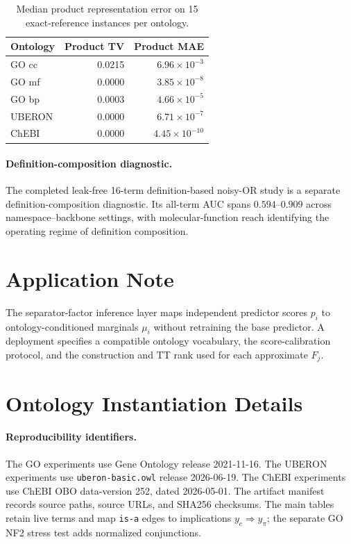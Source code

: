 \documentclass[letterpaper]{article}
\begin{document}
\begin{table}[t]
\centering
\small
\setlength{\tabcolsep}{6pt}
\begin{tabular}{lrr}
\toprule
Ontology & Product TV & Product MAE \\
\midrule
GO cc  & 0.0215 & \(6.96{\times}10^{-3}\) \\
GO mf  & 0.0000 & \(3.85{\times}10^{-8}\) \\
GO bp  & 0.0003 & \(4.66{\times}10^{-5}\) \\
UBERON & 0.0000 & \(6.71{\times}10^{-7}\) \\
ChEBI  & 0.0000 & \(4.45{\times}10^{-10}\) \\
\bottomrule
\end{tabular}
\caption{Median product representation error on 15 exact-reference
instances per ontology.}
\label{tab:separator-rank}
\end{table}

\paragraph{Definition-composition diagnostic.}
The completed leak-free 16-term definition-based noisy-OR study is a
separate definition-composition diagnostic. Its all-term AUC spans
\(0.594\)--\(0.909\) across namespace--backbone settings, with
molecular-function reach identifying the operating regime of definition
composition.

\section{Application Note}
The separator-factor inference layer maps independent predictor scores
\(p_i\) to ontology-conditioned marginals \(\mu_i\) without retraining the
base predictor. A deployment specifies a compatible ontology vocabulary,
the score-calibration protocol, and the construction and TT rank used for
each approximate \(F_j\).

\section{Ontology Instantiation Details}\label{app:multi-ontology}

\paragraph{Reproducibility identifiers.}
The GO experiments use Gene Ontology release 2021-11-16. The UBERON
experiments use \texttt{uberon-basic.owl} release 2026-06-19. The ChEBI
experiments use ChEBI OBO data-version 252, dated 2026-05-01. The artifact
manifest records source paths, source URLs, and SHA256 checksums. The main
tables retain live terms and map \texttt{is-a} edges to implications
\(y_c\Rightarrow y_\pi\); the separate GO NF2 stress test adds normalized
conjunctions.
\end{document}
